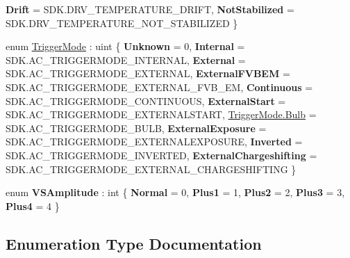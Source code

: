 \begin{DoxyCompactItemize}
\newline
{\bfseries Drift} = S\+D\+K.\+D\+R\+V\+\_\+\+T\+E\+M\+P\+E\+R\+A\+T\+U\+R\+E\+\_\+\+D\+R\+I\+FT, 
{\bfseries Not\+Stabilized} = S\+D\+K.\+D\+R\+V\+\_\+\+T\+E\+M\+P\+E\+R\+A\+T\+U\+R\+E\+\_\+\+N\+O\+T\+\_\+\+S\+T\+A\+B\+I\+L\+I\+Z\+ED
 \}
\item 
enum \hyperlink{namespace_a_n_d_o_r___c_s_1_1_enums_abd5128a32e1bcfb6ccfc0b5214f83ef6}{Trigger\+Mode} \+: uint \{ \newline
{\bfseries Unknown} = 0, 
{\bfseries Internal} = S\+D\+K.\+A\+C\+\_\+\+T\+R\+I\+G\+G\+E\+R\+M\+O\+D\+E\+\_\+\+I\+N\+T\+E\+R\+N\+AL, 
{\bfseries External} = S\+D\+K.\+A\+C\+\_\+\+T\+R\+I\+G\+G\+E\+R\+M\+O\+D\+E\+\_\+\+E\+X\+T\+E\+R\+N\+AL, 
{\bfseries External\+F\+V\+B\+EM} = S\+D\+K.\+A\+C\+\_\+\+T\+R\+I\+G\+G\+E\+R\+M\+O\+D\+E\+\_\+\+E\+X\+T\+E\+R\+N\+A\+L\+\_\+\+F\+V\+B\+\_\+\+EM, 
\newline
{\bfseries Continuous} = S\+D\+K.\+A\+C\+\_\+\+T\+R\+I\+G\+G\+E\+R\+M\+O\+D\+E\+\_\+\+C\+O\+N\+T\+I\+N\+U\+O\+US, 
{\bfseries External\+Start} = S\+D\+K.\+A\+C\+\_\+\+T\+R\+I\+G\+G\+E\+R\+M\+O\+D\+E\+\_\+\+E\+X\+T\+E\+R\+N\+A\+L\+S\+T\+A\+RT, 
\hyperlink{namespace_a_n_d_o_r___c_s_1_1_enums_abd5128a32e1bcfb6ccfc0b5214f83ef6a2b56dc3133a0b7e566a1371db3e7cff8}{Trigger\+Mode.\+Bulb} = S\+D\+K.\+A\+C\+\_\+\+T\+R\+I\+G\+G\+E\+R\+M\+O\+D\+E\+\_\+\+B\+U\+LB, 
{\bfseries External\+Exposure} = S\+D\+K.\+A\+C\+\_\+\+T\+R\+I\+G\+G\+E\+R\+M\+O\+D\+E\+\_\+\+E\+X\+T\+E\+R\+N\+A\+L\+E\+X\+P\+O\+S\+U\+RE, 
\newline
{\bfseries Inverted} = S\+D\+K.\+A\+C\+\_\+\+T\+R\+I\+G\+G\+E\+R\+M\+O\+D\+E\+\_\+\+I\+N\+V\+E\+R\+T\+ED, 
{\bfseries External\+Chargeshifting} = S\+D\+K.\+A\+C\+\_\+\+T\+R\+I\+G\+G\+E\+R\+M\+O\+D\+E\+\_\+\+E\+X\+T\+E\+R\+N\+A\+L\+\_\+\+C\+H\+A\+R\+G\+E\+S\+H\+I\+F\+T\+I\+NG
 \}
\item 
\mbox{\label{namespace_a_n_d_o_r___c_s_1_1_enums_a5010cc57e91a67ae445cb88f9f191481}} 
enum {\bfseries V\+S\+Amplitude} \+: int \{ \newline
{\bfseries Normal} = 0, 
{\bfseries Plus1} = 1, 
{\bfseries Plus2} = 2, 
{\bfseries Plus3} = 3, 
\newline
{\bfseries Plus4} = 4
 \}
\end{DoxyCompactItemize}


\subsection{Enumeration Type Documentation}
\mbox{\label{namespace_a_n_d_o_r___c_s_1_1_enums_ab38791738171af186b6574cad8dbdb85}} 
